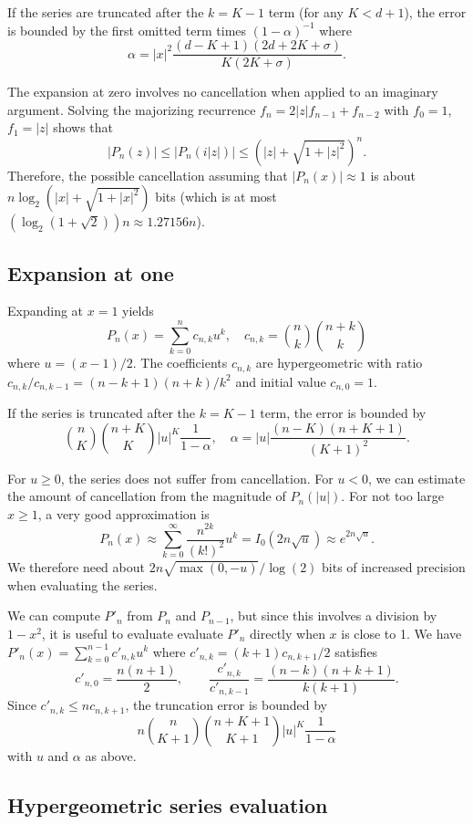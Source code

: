 \documentclass[11pt,a4paper]{article}
\begin{document}
If the series are truncated after the $k = K - 1$ term
(for any $K < d + 1$), the error is bounded by the first
omitted term times $(1-\alpha)^{-1}$
where
$$\alpha = |x|^2 \frac{(d-K+1)(2d+2K+\sigma)}{K (2K+\sigma)}.$$

The expansion at zero involves no cancellation
when applied to an imaginary argument.
Solving the majorizing recurrence $f_n = 2 |z| f_{n-1} + f_{n-2}$ with
$f_0 = 1$, $f_1 = |z|$ shows that
\[ |P_n(z)| \le |P_n(i|z|)| \le \left(|z| + \sqrt{1 + |z|^2}\right)^n. \]
Therefore, the possible cancellation assuming that $|P_n(x)| \approx 1$
is about $n \log_2(|x| + \sqrt{1 + |x|^2})$ bits
(which is at most $(\log_2 (1+\sqrt{2})) n \approx 1.27156n$).

\subsection{Expansion at one}

Expanding at $x = 1$ yields
$$P_n(x) = \sum_{k=0}^n c_{n,k} u^k, \quad c_{n,k} = {n \choose k} {n+k \choose k}$$
where $u = (x-1)/2$.
The coefficients $c_{n,k}$ are hypergeometric with
ratio $c_{n,k}/c_{n,k-1} = (n-k+1)(n+k)/k^2$
and initial value $c_{n,0} = 1$.

If the series is truncated after the $k = K - 1$ term,
the error is bounded by
$${n \choose K}{n+K \choose K} |u|^K \frac{1}{1-\alpha}, \quad \alpha = |u| \frac{(n-K)(n+K+1)}{(K+1)^2}.$$

For $u \ge 0$, the series does not suffer from cancellation.
For $u < 0$, we can estimate the amount of
cancellation from the magnitude of $P_n(|u|)$.
For not too large $x \ge 1$, a very good approximation is
$$P_n(x) \approx \sum_{k=0}^{\infty} \frac{n^{2k}}{(k!)^2} u^k = I_0(2n\sqrt{u}) \approx e^{2n\sqrt{u}}.$$
We therefore need about $2n\sqrt{\max(0,-u)} / \log(2)$ bits
of increased precision when evaluating the series.

We can compute $P'_n$ from $P_n$ and $P_{n-1}$, but since this
involves a division by $1-x^2$, it is useful to evaluate
evaluate $P'_n$ directly when $x$ is close to 1.
We have
$P'_n(x) = \sum_{k=0}^{n-1} c'_{n,k} u^k$
where $c'_{n,k} = (k+1) c_{n,k+1} / 2$ satisfies
\[
  c'_{n,0} = \frac{n(n+1)}{2}, \qquad
  \frac{c'_{n,k}}{c'_{n,k-1}} = \frac{(n-k)(n+k+1)}{k(k+1)}.
\]
Since $c'_{n,k} \le n c_{n,k+1}$, the truncation error is bounded by
$$n {n \choose K+1}{n+K+1 \choose K+1} |u|^K \frac{1}{1-\alpha}$$
with $u$ and $\alpha$ as above.

\subsection{Hypergeometric series evaluation}
\end{document}
